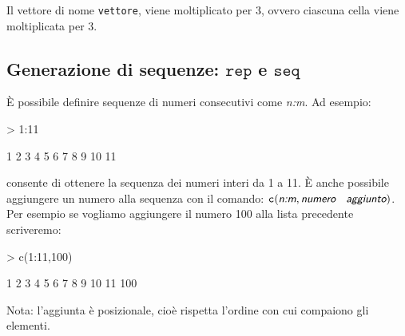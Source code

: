 \documentclass[onecolumn,11pt]{book}
\newcommand{\varia}[1]{\textsl{\textsf{#1}}}
\begin{document}
Il vettore di nome \texttt{vettore}, viene moltiplicato per 3, ovvero ciascuna cella viene moltiplicata per 3.
\subsection{Generazione di sequenze: $\texttt{rep}$ e $\texttt{seq}$}
\`E possibile definire sequenze di numeri consecutivi come  \varia{n:m}.
Ad esempio:
\begin{Schunk}
\begin{Sinput}
> 1:11
\end{Sinput}
\begin{Soutput}
 [1]  1  2  3  4  5  6  7  8  9 10 11
\end{Soutput}
\end{Schunk}
consente di ottenere la sequenza dei numeri interi da 1 a 11. \`E anche possibile aggiungere un numero alla sequenza con il comando:
$\texttt{c}(\varia{n:m},\varia{numero \; aggiunto})$.
Per esempio se vogliamo aggiungere il numero 100 alla lista precedente scriveremo:
\begin{Schunk}
\begin{Sinput}
> c(1:11,100)
\end{Sinput}
\begin{Soutput}
 [1]   1   2   3   4   5   6   7   8   9  10  11 100
\end{Soutput}
\end{Schunk}
Nota: l'aggiunta \`e posizionale, cio\`e rispetta l'ordine con cui compaiono gli elementi.
\end{document}
